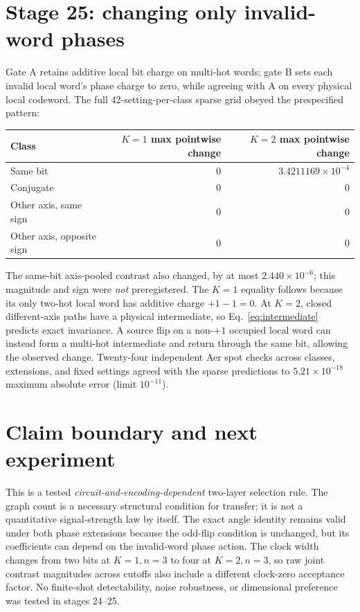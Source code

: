 \documentclass[10pt,a4paper]{article}
\begin{document}
\section*{Stage 25: changing only invalid-word phases}
Gate A retains additive local bit charge on multi-hot words; gate B sets each invalid local word's phase charge to zero, while agreeing with A on every physical local codeword. The full 42-setting-per-class sparse grid obeyed the prespecified pattern:
\begin{center}
\small
\begin{tabular}{@{}l r r@{}}\toprule
Class & $K=1$ max pointwise change & $K=2$ max pointwise change\\\midrule
Same bit & $0$ & $3.4211169\times10^{-4}$\\
Conjugate & $0$ & $0$\\
Other axis, same sign & $0$ & $0$\\
Other axis, opposite sign & $0$ & $0$\\\bottomrule
\end{tabular}
\end{center}
The same-bit axis-pooled contrast also changed, by at most $2.440\times10^{-6}$; this magnitude and sign were \emph{not} preregistered. The $K=1$ equality follows because its only two-hot local word has additive charge $+1-1=0$. At $K=2$, closed different-axis paths have a physical intermediate, so Eq.~\eqref{eq:intermediate} predicts exact invariance. A source flip on a non-$+1$ occupied local word can instead form a multi-hot intermediate and return through the same bit, allowing the observed change. Twenty-four independent Aer spot checks across classes, extensions, and fixed settings agreed with the sparse predictions to $5.21\times10^{-18}$ maximum absolute error (limit $10^{-11}$).

\section*{Claim boundary and next experiment}
This is a tested \emph{circuit-and-encoding-dependent} two-layer selection rule. The graph count is a necessary structural condition for transfer; it is not a quantitative signal-strength law by itself. The exact angle identity remains valid under both phase extensions because the odd-flip condition is unchanged, but its coefficients can depend on the invalid-word phase action. The clock width changes from two bits at $K=1,n=3$ to four at $K=2,n=3$, so raw joint contrast magnitudes across cutoffs also include a different clock-zero acceptance factor. No finite-shot detectability, noise robustness, or dimensional preference was tested in stages 24--25.
\end{document}
